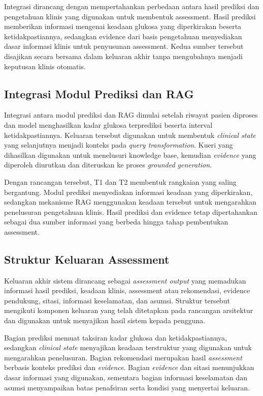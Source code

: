 Integrasi dirancang dengan mempertahankan perbedaan antara hasil prediksi dan pengetahuan klinis yang digunakan untuk membentuk assessment. Hasil prediksi memberikan informasi mengenai
keadaan glukosa yang diperkirakan beserta ketidakpastiannya, sedangkan evidence dari basis pengetahuan menyediakan dasar informasi klinis untuk penyusunan assessment. Kedua sumber
tersebut disajikan secara bersama dalam keluaran akhir tanpa mengubahnya menjadi keputusan klinis otomatis.

\subsection{Integrasi Modul Prediksi dan RAG} 
\label{subsec:bab4-integrasi-prediksi-rag}

Integrasi antara modul prediksi dan RAG dimulai setelah riwayat pasien diproses dan model menghasilkan kadar glukosa terprediksi beserta interval ketidakpastiannya. Keluaran tersebut
digunakan untuk membentuk \textit{clinical state} yang selanjutnya menjadi konteks pada \textit{query transformation}. Kueri yang dihasilkan digunakan untuk menelusuri knowledge base,
kemudian \textit{evidence} yang diperoleh diurutkan dan diteruskan ke proses \textit{grounded generation}.

Dengan rancangan tersebut, T1 dan T2 membentuk rangkaian yang saling bergantung. Modul prediksi menyediakan informasi keadaan yang diperkirakan, sedangkan mekanisme RAG menggunakan
keadaan tersebut untuk mengarahkan penelusuran pengetahuan klinis. Hasil prediksi dan evidence tetap dipertahankan sebagai dua sumber informasi yang berbeda hingga tahap pembentukan
assessment.

\subsection{Struktur Keluaran Assessment} 
\label{subsec:bab4-struktur-assessment-output}

Keluaran akhir sistem dirancang sebagai \textit{assessment output} yang memadukan informasi hasil prediksi, keadaan klinis, assessment atau rekomendasi, evidence pendukung, sitasi,
informasi keselamatan, dan asumsi. Struktur tersebut mengikuti komponen keluaran yang telah ditetapkan pada rancangan arsitektur dan digunakan untuk menyajikan hasil sistem kepada
pengguna.

Bagian prediksi memuat taksiran kadar glukosa dan ketidakpastiannya, sedangkan \textit{clinical state} menyajikan keadaan terstruktur yang digunakan untuk mengarahkan
penelusuran. Bagian rekomendasi merupakan hasil \textit{assessment} berbasis konteks prediksi dan \textit{evidence}. Bagian \textit{evidence} dan sitasi menunjukkan dasar
informasi yang digunakan, sementara bagian informasi keselamatan dan asumsi menyampaikan batas penafsiran serta kondisi yang menyertai keluaran.

